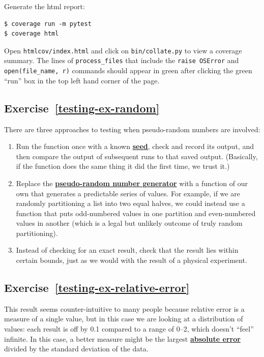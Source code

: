 \documentclass[
]{krantz}
\newcommand{\gref}[2]{\hyperlink{#2}{\textbf{#1}}}
\begin{document}
Generate the html report:

\begin{verbatim}
$ coverage run -m pytest
$ coverage html
\end{verbatim}

Open \texttt{htmlcov/index.html} and click on \texttt{bin/collate.py} to view a coverage summary.
The lines of \texttt{process\_files} that include the \texttt{raise\ OSError} and
\texttt{open(file\_name,\ \textquotesingle{}r\textquotesingle{})} commands should appear in green after clicking the green ``run'' box
in the top left hand corner of the page.

\hypertarget{exercise-reftesting-ex-random}{%
\subsection*{Exercise~\ref{testing-ex-random}}\label{exercise-reftesting-ex-random}}


There are three approaches to testing when pseudo-random numbers are involved:

\begin{enumerate}
\def\labelenumi{\arabic{enumi}.}
\item
  Run the function once with a known \gref{seed}{seed},
  check and record its output,
  and then compare the output of subsequent runs to that saved output.
  (Basically, if the function does the same thing it did the first time, we trust it.)
\item
  Replace the \gref{pseudo-random number generator}{prng} with a function of our own
  that generates a predictable series of values.
  For example,
  if we are randomly partitioning a list into two equal halves,
  we could instead use a function that puts odd-numbered values in one partition
  and even-numbered values in another
  (which is a legal but unlikely outcome of truly random partitioning).
\item
  Instead of checking for an exact result,
  check that the result lies within certain bounds,
  just as we would with the result of a physical experiment.
\end{enumerate}

\hypertarget{exercise-reftesting-ex-relative-error}{%
\subsection*{Exercise~\ref{testing-ex-relative-error}}\label{exercise-reftesting-ex-relative-error}}


This result seems counter-intuitive to many people because relative error is a measure of a single value,
but in this case we are looking at a distribution of values:
each result is off by 0.1 compared to a range of 0--2,
which doesn't ``feel'' infinite.
In this case,
a better measure might be the largest \gref{absolute error}{absolute\_error}
divided by the standard deviation of the data.
\end{document}

